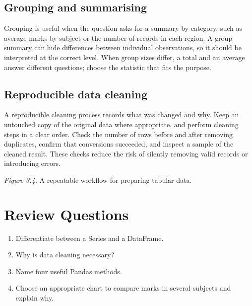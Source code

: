 \documentclass[11pt,openany,oneside]{book}
\begin{document}
\subsection{Grouping and summarising}
Grouping is useful when the question asks for a summary by category, such as average marks by subject or the number of records in each region. A group summary can hide differences between individual observations, so it should be interpreted at the correct level. When group sizes differ, a total and an average answer different questions; choose the statistic that fits the purpose.

\subsection{Reproducible data cleaning}
A reproducible cleaning process records what was changed and why. Keep an untouched copy of the original data where appropriate, and perform cleaning steps in a clear order. Check the number of rows before and after removing duplicates, confirm that conversions succeeded, and inspect a sample of the cleaned result. These checks reduce the risk of silently removing valid records or introducing errors.

\begin{center}
\end{center}
\textit{Figure 3.4.} A repeatable workflow for preparing tabular data.

\section*{Review Questions}
\begin{enumerate}
\item Differentiate between a Series and a DataFrame.
\item Why is data cleaning necessary?
\item Name four useful Pandas methods.
\item Choose an appropriate chart to compare marks in several subjects and explain why.
\end{enumerate}
\end{document}
